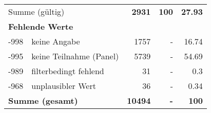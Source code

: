 \begin{longtable}{lXrrr}
     \midrule
     \multicolumn{2}{l}{Summe (gültig)} &
       \textbf{\num{2931}} &
     \textbf{100} &
       \textbf{\num[round-mode=places,round-precision=2]{27,93}} \\
     \multicolumn{5}{l}{\textbf{Fehlende Werte}}\\
       -998 &
       keine Angabe &
         \num{1757} &
        - &
         \num[round-mode=places,round-precision=2]{16,74} \\
       -995 &
       keine Teilnahme (Panel) &
         \num{5739} &
        - &
         \num[round-mode=places,round-precision=2]{54,69} \\
       -989 &
       filterbedingt fehlend &
         \num{31} &
        - &
         \num[round-mode=places,round-precision=2]{0,3} \\
       -968 &
       unplausibler Wert &
         \num{36} &
        - &
         \num[round-mode=places,round-precision=2]{0,34} \\
     \midrule
     \multicolumn{2}{l}{\textbf{Summe (gesamt)}} &
          \textbf{\num{10494}} &
        \textbf{-} &
        \textbf{100} \\
     \bottomrule
     \end{longtable}
     
